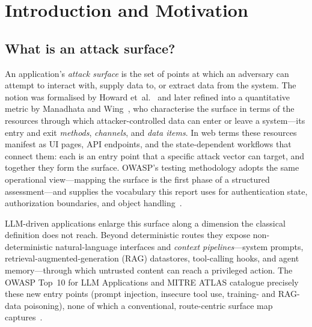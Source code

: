 \documentclass[11pt,a4paper]{article}
\begin{document}
\tableofcontents
\clearpage

\section{Introduction and Motivation}

\subsection{What is an attack surface?}
An application's \emph{attack surface} is the set of points at which an adversary can
attempt to interact with, supply data to, or extract data from the system. The notion
was formalised by Howard et~al.~\citeyearpar{howard} and later refined into a
quantitative metric by Manadhata and Wing~\citeyearpar{manadhata}, who characterise the
surface in terms of the resources through which attacker-controlled data can enter or
leave a system---its entry and exit \emph{methods}, \emph{channels}, and \emph{data
items}. In web
terms these resources manifest as UI pages, API endpoints, and the state-dependent
workflows that connect them: each is an entry point that a specific attack vector can
target, and together they form the surface. OWASP's testing methodology adopts the same
operational view---mapping the surface is the first phase of a structured
assessment---and supplies the vocabulary this report uses for authentication state,
authorization boundaries, and object handling~\citep{wstg,owaspapi}.

LLM-driven applications enlarge this surface along a dimension the classical definition
does not reach. Beyond deterministic routes they expose non-deterministic
natural-language interfaces and \emph{context pipelines}---system prompts,
retrieval-augmented-generation (RAG) datastores, tool-calling hooks, and agent
memory---through which untrusted content can reach a privileged action. The OWASP Top~10
for LLM Applications and MITRE ATLAS catalogue precisely these new entry points (prompt
injection, insecure tool use, training- and RAG-data poisoning), none of which a
conventional, route-centric surface map captures~\citep{owaspllm,atlas}.
\end{document}
